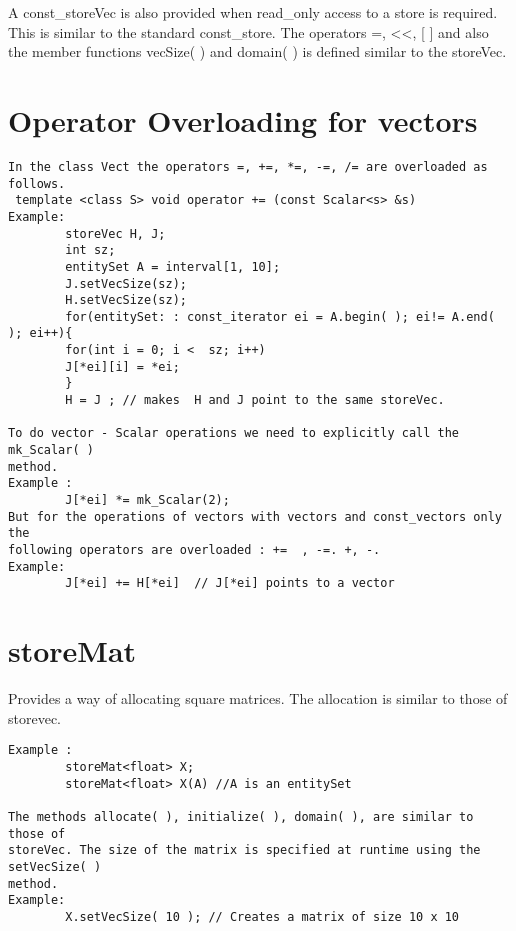 \documentclass[letterpaper,12pt]{article}
\begin{document}
A const\_storeVec is also provided when read\_only access to a store is required. 
This is similar to the standard const\_store.
The operators =, <<, [ ] and also the member functions vecSize( ) and domain( ) 
is defined similar to the storeVec. 

\section*{Operator Overloading for vectors}
\begin{verbatim}
In the class Vect the operators =, +=, *=, -=, /= are overloaded as follows. 
 template <class S> void operator += (const Scalar<s> &s)
Example:
        storeVec H, J;
        int sz;
        entitySet A = interval[1, 10];
        J.setVecSize(sz);
        H.setVecSize(sz);
        for(entitySet: : const_iterator ei = A.begin( ); ei!= A.end( ); ei++){
        for(int i = 0; i <  sz; i++)
        J[*ei][i] = *ei;
        }       
        H = J ; // makes  H and J point to the same storeVec.

To do vector - Scalar operations we need to explicitly call the mk_Scalar( ) 
method. 
Example :
        J[*ei] *= mk_Scalar(2);
But for the operations of vectors with vectors and const_vectors only the 
following operators are overloaded : +=  , -=. +, -. 
Example:
        J[*ei] += H[*ei]  // J[*ei] points to a vector

\end{verbatim}

\section{storeMat}
Provides a way of allocating square matrices. The allocation is similar to those 
of storevec. 
\begin{verbatim}
Example :
        storeMat<float> X;
        storeMat<float> X(A) //A is an entitySet

The methods allocate( ), initialize( ), domain( ), are similar to those of 
storeVec. The size of the matrix is specified at runtime using the setVecSize( ) 
method. 
Example:
        X.setVecSize( 10 ); // Creates a matrix of size 10 x 10
\end{verbatim}
\end{document}
